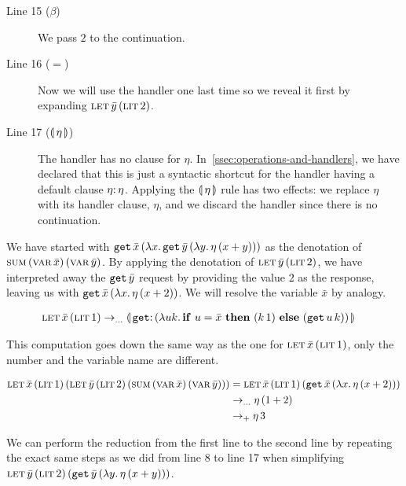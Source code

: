 \begin{description}
  \item[Line 15 ($\beta$)] We pass $2$ to the continuation.

  \item[Line 16 ($=$)] Now we will use the handler one last time so we
    reveal it first by expanding $\textsc{let}\,\bar{y}\,(\textsc{lit}\,2)$.

  \item[Line 17 ($\llparenthesis \, \eta \, \rrparenthesis$)] The handler has no clause for
    $\eta$. In~\ref{ssec:operations-and-handlers}, we have declared that
    this is just a syntactic shortcut for the handler having a default
    clause $\onto{\eta}{\eta}$. Applying the $\llparenthesis \, \eta \, \rrparenthesis$ rule has two
    effects: we replace $\eta$ with its handler clause, $\eta$, and we
    discard the handler since there is no continuation.
\end{description}

We have started with $\mathtt{get}\,\bar{x}\,(\lambda x.\, \mathtt{get}\,\bar{y}\,(\lambda y.\, \eta\,(x + y)))$ as the
denotation of $\textsc{sum}\,(\textsc{var}\,\bar{x})\,(\textsc{var}\,\bar{y})$. By applying the denotation
of $\textsc{let}\,\bar{y}\,(\textsc{lit}\,2)$, we have interpreted away the
$\mathtt{get}\,\bar{y}$ request by providing the value $2$ as the
response, leaving us with $\mathtt{get}\,\bar{x}\,(\lambda x.\, \eta\,(x +
      2))$. We will resolve the variable $\bar{x}$ by analogy.

\begin{align*}
  \app{\lete}{\bar{x}}{\litec{1}}
&\to_{\ldots} \banana{\onto{\op{get}}{(\lam{u k}{\ifte{u = \bar{x}}{(\ap{k}{1})}{(\app{\op{get}}{u}{k})}})}}
\end{align*}

This computation goes down the same way as the one for
$\textsc{let}\,\bar{x}\,(\textsc{lit}\,1)$, only the number and the variable name
are different.


\begin{align*}
\textsc{let}\,\bar{x}\,(\textsc{lit}\,1)\,(\textsc{let}\,\bar{y}\,(\textsc{lit}\,2)\,(\textsc{sum}\,(\textsc{var}\,\bar{x})\,(\textsc{var}\,\bar{y})))
& = \textsc{let}\,\bar{x}\,(\textsc{lit}\,1)\,(\mathtt{get}\,\bar{x}\,(\lambda x.\, \eta\,(x + 2))) \\
& \to_{\ldots} \eta\,(1 + 2) \\
& \to_{+} \eta\,3
\end{align*}

We can perform the reduction from the first line to the second line by
repeating the exact same steps as we did from line 8 to line 17 when
simplifying $\textsc{let}\,\bar{y}\,(\textsc{lit}\,2)\,(\mathtt{get}\,\bar{y}\,(\lambda y.\, \eta\,(x + y)))$.

